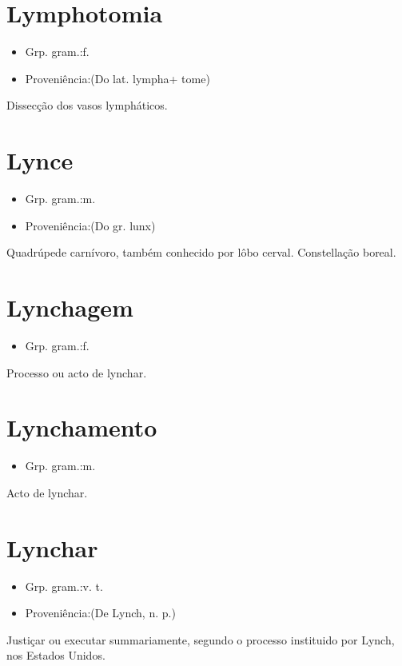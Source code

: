 \section{Lymphotomia}
\begin{itemize}
\item {Grp. gram.:f.}
\end{itemize}
\begin{itemize}
\item {Proveniência:(Do lat. \textunderscore lympha\textunderscore  + \textunderscore tome\textunderscore )}
\end{itemize}
Dissecção dos vasos lympháticos.
\section{Lynce}
\begin{itemize}
\item {Grp. gram.:m.}
\end{itemize}
\begin{itemize}
\item {Proveniência:(Do gr. \textunderscore lunx\textunderscore )}
\end{itemize}
Quadrúpede carnívoro, também conhecido por \textunderscore lôbo cerval\textunderscore .
Constellação boreal.
\section{Lynchagem}
\begin{itemize}
\item {Grp. gram.:f.}
\end{itemize}
Processo ou acto de lynchar.
\section{Lynchamento}
\begin{itemize}
\item {Grp. gram.:m.}
\end{itemize}
Acto de lynchar.
\section{Lynchar}
\begin{itemize}
\item {Grp. gram.:v. t.}
\end{itemize}
\begin{itemize}
\item {Proveniência:(De \textunderscore Lynch\textunderscore , n. p.)}
\end{itemize}
Justiçar ou executar summariamente, segundo o processo instituido por Lynch, nos Estados Unidos.
